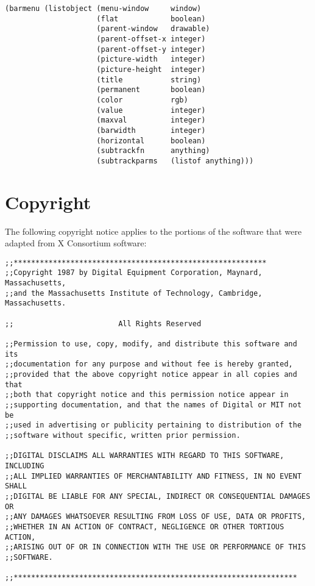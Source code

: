 \vspace*{-.2in}

\begin{verbatim}
(barmenu (listobject (menu-window     window)
                     (flat            boolean)
                     (parent-window   drawable)
                     (parent-offset-x integer)
                     (parent-offset-y integer)
                     (picture-width   integer)
                     (picture-height  integer)
                     (title           string)
                     (permanent       boolean)
                     (color           rgb)
                     (value           integer)
                     (maxval          integer)
                     (barwidth        integer)
                     (horizontal      boolean)
                     (subtrackfn      anything)
                     (subtrackparms   (listof anything)))
\end{verbatim}


\pagebreak

\section{Copyright}

The following copyright notice applies to the portions of the software
that were adapted from X Consortium software:
\begin{verbatim}
;;**********************************************************
;;Copyright 1987 by Digital Equipment Corporation, Maynard, Massachusetts,
;;and the Massachusetts Institute of Technology, Cambridge, Massachusetts.

;;                        All Rights Reserved

;;Permission to use, copy, modify, and distribute this software and its 
;;documentation for any purpose and without fee is hereby granted, 
;;provided that the above copyright notice appear in all copies and that
;;both that copyright notice and this permission notice appear in 
;;supporting documentation, and that the names of Digital or MIT not be
;;used in advertising or publicity pertaining to distribution of the
;;software without specific, written prior permission.  

;;DIGITAL DISCLAIMS ALL WARRANTIES WITH REGARD TO THIS SOFTWARE, INCLUDING
;;ALL IMPLIED WARRANTIES OF MERCHANTABILITY AND FITNESS, IN NO EVENT SHALL
;;DIGITAL BE LIABLE FOR ANY SPECIAL, INDIRECT OR CONSEQUENTIAL DAMAGES OR
;;ANY DAMAGES WHATSOEVER RESULTING FROM LOSS OF USE, DATA OR PROFITS,
;;WHETHER IN AN ACTION OF CONTRACT, NEGLIGENCE OR OTHER TORTIOUS ACTION,
;;ARISING OUT OF OR IN CONNECTION WITH THE USE OR PERFORMANCE OF THIS
;;SOFTWARE.

;;*****************************************************************

\end{verbatim}




